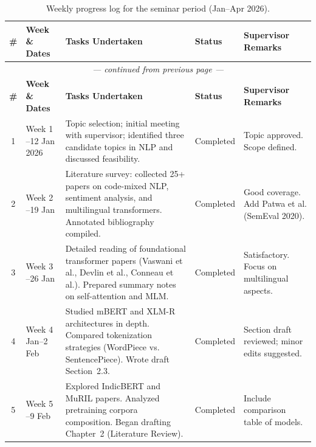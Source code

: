 \documentclass[12pt,a4paper]{report}
\newcommand{\progressdone}{\textcolor{accent2}{\faCheckCircle}\hspace{2pt}Completed}
\begin{document}
\setlength{\tabcolsep}{4pt}
\footnotesize
\begin{longtable}{@{}c >{\raggedright}p{2.2cm} >{\raggedright}p{6cm} >{\raggedright}p{2.2cm} >{\raggedright\arraybackslash}p{2.5cm}@{}}
\caption{Weekly progress log for the seminar period (Jan--Apr 2026).}\label{tab:progress}\\
\toprule
\rowcolor{accent}
\color{white}\textbf{\#} & \color{white}\textbf{Week \& Dates} & \color{white}\textbf{Tasks Undertaken} & \color{white}\textbf{Status} & \color{white}\textbf{Supervisor Remarks} \\
\midrule
\endfirsthead
\multicolumn{5}{c}{\textit{--- continued from previous page ---}}\\[4pt]
\toprule
\rowcolor{accent}
\color{white}\textbf{\#} & \color{white}\textbf{Week \& Dates} & \color{white}\textbf{Tasks Undertaken} & \color{white}\textbf{Status} & \color{white}\textbf{Supervisor Remarks} \\
\midrule
\endhead
\bottomrule
\endfoot
\rowcolor{black!4} 1  & Week 1 \newline 6--12 Jan 2026 & Topic selection; initial meeting with supervisor; identified three candidate topics in NLP and discussed feasibility.                                      & \progressdone  & Topic approved. Scope defined. \\
\rowcolor{white}    2  & Week 2 \newline 13--19 Jan    & Literature survey: collected 25+ papers on code-mixed NLP, sentiment analysis, and multilingual transformers. Annotated bibliography compiled.        & \progressdone  & Good coverage. Add Patwa et al. (SemEval 2020). \\
\rowcolor{black!4} 3  & Week 3 \newline 20--26 Jan    & Detailed reading of foundational transformer papers (Vaswani et al., Devlin et al., Conneau et al.). Prepared summary notes on self-attention and MLM. & \progressdone  & Satisfactory. Focus on multilingual aspects. \\
\rowcolor{white}    4  & Week 4 \newline 27 Jan--2 Feb & Studied mBERT and XLM-R architectures in depth. Compared tokenization strategies (WordPiece vs. SentencePiece). Wrote draft Section~2.3.               & \progressdone  & Section draft reviewed; minor edits suggested. \\
\rowcolor{black!4} 5  & Week 5 \newline 3--9 Feb      & Explored IndicBERT and MuRIL papers. Analyzed pretraining corpora composition. Began drafting Chapter~2 (Literature Review).                         & \progressdone  & Include comparison table of models. \\

\end{longtable}
\end{document}
